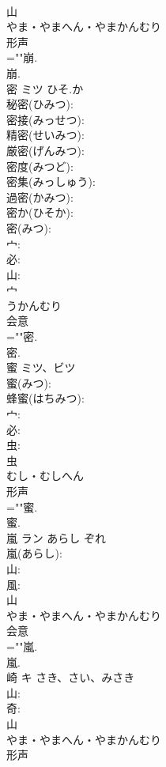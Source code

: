\documentclass[8pt]{extreport}
\begin{document}
\begin{CJK}{UTF8}{min}
\\	山	
\\	やま・やまへん・やまかんむり	
\\	形声 
\\	=""崩.
\\	崩.
\\	密	ミツ	ひそ.か		
\\	秘密(ひみつ): 
\\	密接(みっせつ): 
\\	精密(せいみつ): 
\\	厳密(げんみつ): 
\\	密度(みつど): 
\\	密集(みっしゅう): 
\\	過密(かみつ): 
\\	密か(ひそか): 
\\	密(みつ): 
\\	宀: 
\\	必: 
\\	山: 
\\	宀	
\\	うかんむり	
\\	会意 
\\	=""密.
\\	密.
\\	蜜	ミツ、ビツ			
\\	蜜(みつ): 
\\	蜂蜜(はちみつ): 
\\	宀: 
\\	必: 
\\	虫: 
\\	虫	
\\	むし・むしへん	
\\	形声 
\\	=""蜜.
\\	蜜.
\\	嵐	ラン	あらし	ぞれ	
\\	嵐(あらし): 
\\	山: 
\\	風: 
\\	山	
\\	やま・やまへん・やまかんむり	
\\	会意 
\\	=""嵐.
\\	嵐.
\\	崎	キ	さき、さい、みさき		
\\	山: 
\\	奇: 
\\	山	
\\	やま・やまへん・やまかんむり	
\\	形声 

\end{CJK}
\end{document}
